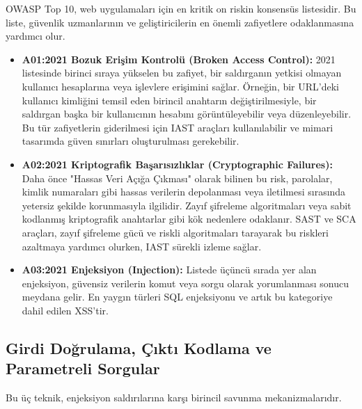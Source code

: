 OWASP Top 10, web uygulamaları için en kritik on riskin konsensüs listesidir. Bu liste, güvenlik uzmanlarının ve geliştiricilerin en önemli zafiyetlere odaklanmasına yardımcı olur.

\begin{itemize}
\item \textbf{A01:2021 Bozuk Erişim Kontrolü (Broken Access Control):} 2021 listesinde birinci sıraya yükselen bu zafiyet, bir saldırganın yetkisi olmayan kullanıcı hesaplarına veya işlevlere erişimini sağlar. Örneğin, bir URL'deki kullanıcı kimliğini temsil eden birincil anahtarın değiştirilmesiyle, bir saldırgan başka bir kullanıcının hesabını görüntüleyebilir veya düzenleyebilir. Bu tür zafiyetlerin giderilmesi için IAST araçları kullanılabilir ve mimari tasarımda güven sınırları oluşturulması gerekebilir.
\item \textbf{A02:2021 Kriptografik Başarısızlıklar (Cryptographic Failures):} Daha önce "Hassas Veri Açığa Çıkması" olarak bilinen bu risk, parolalar, kimlik numaraları gibi hassas verilerin depolanması veya iletilmesi sırasında yetersiz şekilde korunmasıyla ilgilidir. Zayıf şifreleme algoritmaları veya sabit kodlanmış kriptografik anahtarlar gibi kök nedenlere odaklanır. SAST ve SCA araçları, zayıf şifreleme gücü ve riskli algoritmaları tarayarak bu riskleri azaltmaya yardımcı olurken, IAST sürekli izleme sağlar.
\item \textbf{A03:2021 Enjeksiyon (Injection):} Listede üçüncü sırada yer alan enjeksiyon, güvensiz verilerin komut veya sorgu olarak yorumlanması sonucu meydana gelir. En yaygın türleri SQL enjeksiyonu ve artık bu kategoriye dahil edilen XSS'tir.
\end{itemize}

\subsection{Girdi Doğrulama, Çıktı Kodlama ve Parametreli Sorgular}

Bu üç teknik, enjeksiyon saldırılarına karşı birincil savunma mekanizmalarıdır.

